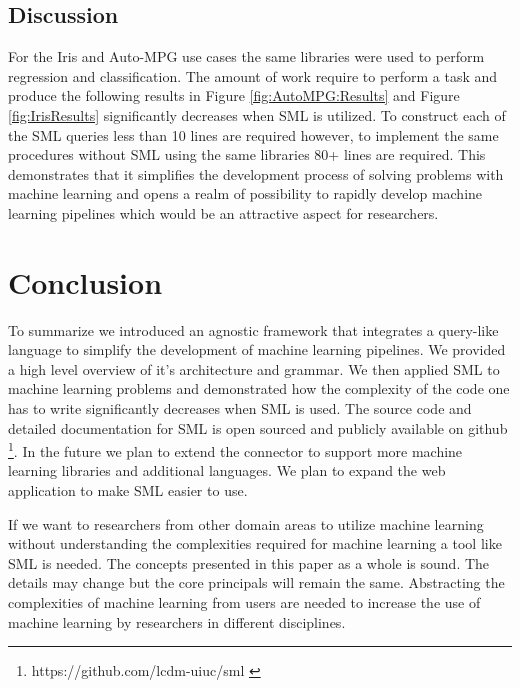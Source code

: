 \documentclass[jair,twoside,11pt,theapa]{article}
\begin{document}
\subsection{Discussion}
For the Iris and Auto-MPG use cases the same libraries were used to perform regression and classification. The amount of work require to perform a task and produce the following results in Figure \ref{fig:AutoMPG:Results} and Figure \ref{fig:IrisResults} significantly decreases when SML is utilized. To construct each of the SML queries less than 10 lines are required however, to implement the same procedures without SML using the same libraries 80+ lines are required. This demonstrates that it simplifies the development process of solving problems with machine learning and opens a realm of possibility to rapidly develop machine learning pipelines which would be an attractive aspect for researchers.

\section{Conclusion}
\label{conclusion}
To summarize we introduced an agnostic framework that integrates a query-like language to simplify the development of machine learning pipelines. We provided a high level overview of it's architecture and grammar. We then applied SML to machine learning problems and demonstrated how the complexity of the code one has to write significantly decreases when SML is used. The source code and detailed documentation for SML is open sourced and publicly available on github \footnote{https://github.com/lcdm-uiuc/sml \label{SML:Github}}. In the future we plan to extend the connector to support more machine learning libraries and additional languages. We plan to expand the web application to make SML easier to use.

If we want to researchers from other domain areas to utilize machine learning without understanding the complexities required for machine learning a tool like SML is needed. The concepts presented in this paper as a whole is sound. The details may change but the core principals will remain the same. Abstracting the complexities of machine learning from users are needed to increase the use of machine learning by researchers in different disciplines.



\vskip 0.2in


\end{document}
